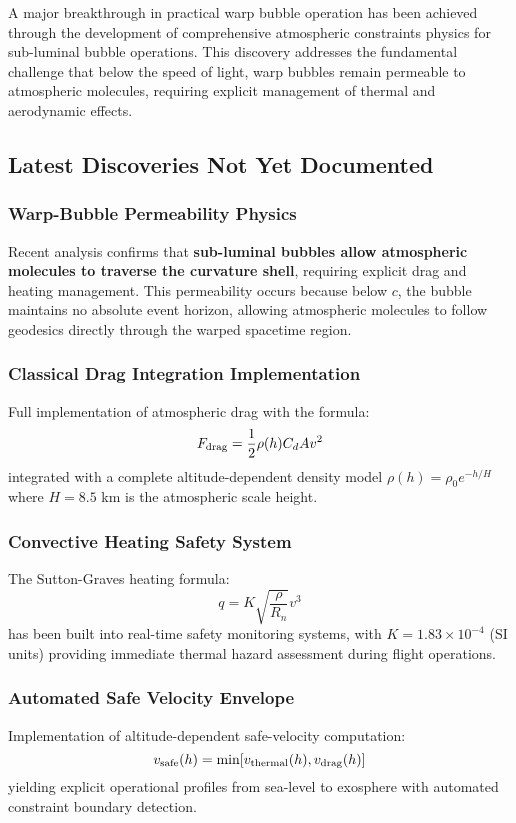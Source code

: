 \documentclass[11pt]{article}
\begin{document}
A major breakthrough in practical warp bubble operation has been achieved through the development of comprehensive atmospheric constraints physics for sub-luminal bubble operations. This discovery addresses the fundamental challenge that below the speed of light, warp bubbles remain permeable to atmospheric molecules, requiring explicit management of thermal and aerodynamic effects.

\subsection{Latest Discoveries Not Yet Documented}

\subsubsection{Warp-Bubble Permeability Physics}
Recent analysis confirms that \textbf{sub-luminal bubbles allow atmospheric molecules to traverse the curvature shell}, requiring explicit drag and heating management. This permeability occurs because below $c$, the bubble maintains no absolute event horizon, allowing atmospheric molecules to follow geodesics directly through the warped spacetime region.

\subsubsection{Classical Drag Integration Implementation}
Full implementation of atmospheric drag with the formula:
\begin{equation}
F_{\rm drag} = \frac{1}{2} \rho(h) C_d A v^2
\end{equation}
integrated with a complete altitude-dependent density model $\rho(h) = \rho_0 e^{-h/H}$ where $H = 8.5$ km is the atmospheric scale height.

\subsubsection{Convective Heating Safety System}
The Sutton-Graves heating formula:
\begin{equation}
q = K\sqrt{\frac{\rho}{R_n}} v^3
\end{equation}
has been built into real-time safety monitoring systems, with $K = 1.83 \times 10^{-4}$ (SI units) providing immediate thermal hazard assessment during flight operations.

\subsubsection{Automated Safe Velocity Envelope}
Implementation of altitude-dependent safe-velocity computation:
\begin{equation}
v_{\rm safe}(h) = \min[v_{\rm thermal}(h), v_{\rm drag}(h)]
\end{equation}
yielding explicit operational profiles from sea-level to exosphere with automated constraint boundary detection.
\end{document}
